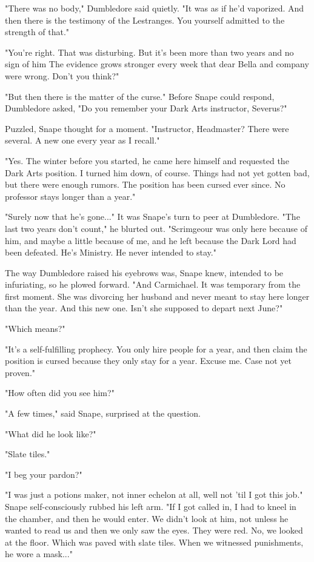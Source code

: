 "There was no body," Dumbledore said quietly. "It was as if he'd vaporized. And then there is the testimony of the Lestranges. You yourself admitted to the strength of that."

"You're right. That was disturbing. But it's been more than two years and no sign of him The evidence grows stronger every week that dear Bella and company were wrong. Don't you think?"

"But then there is the matter of the curse." Before Snape could respond, Dumbledore asked, "Do you remember your Dark Arts instructor, Severus?"

Puzzled, Snape thought for a moment. "Instructor, Headmaster? There were several. A new one every year as I recall."

"Yes. The winter before you started, he came here himself and requested the Dark Arts position. I turned him down, of course. Things had not yet gotten bad, but there were enough rumors. The position has been cursed ever since. No professor stays longer than a year."

"Surely now that he's gone..." It was Snape's turn to peer at Dumbledore. "The last two years don't count," he blurted out. "Scrimgeour was only here because of him, and maybe a little because of me, and he left because the Dark Lord had been defeated. He's Ministry. He never intended to stay."

The way Dumbledore raised his eyebrows was, Snape knew, intended to be infuriating, so he plowed forward. "And Carmichael. It was temporary from the first moment. She was divorcing her husband and never meant to stay here longer than the year. And this new one. Isn't she supposed to depart next June?"

"Which means?"

"It's a self-fulfilling prophecy. You only hire people for a year, and then claim the position is cursed because they only stay for a year. Excuse me. Case not yet proven."

"How often did you see him?"

"A few times," said Snape, surprised at the question.

"What did he look like?"

"Slate tiles."

"I beg your pardon?"

"I was just a potions maker, not inner echelon at all, well not 'til I got this job." Snape self-consciously rubbed his left arm. "If I got called in, I had to kneel in the chamber, and then he would enter. We didn't look at him, not unless he wanted to read us and then we only saw the eyes. They were red. No, we looked at the floor. Which was paved with slate tiles. When we witnessed punishments, he wore a mask..."

